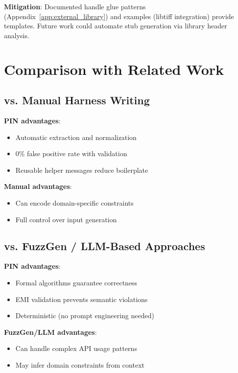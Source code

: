 \documentclass[doublespace,nopageskip]{VTthesis}
\begin{document}
\textbf{Mitigation}: Documented handle glue patterns (Appendix~\ref{app:external_library}) and examples (libtiff integration) provide templates. Future work could automate stub generation via library header analysis.

\section{Comparison with Related Work}

\subsection{vs. Manual Harness Writing}

\textbf{PIN advantages}:
\begin{itemize}
    \item Automatic extraction and normalization
    \item 0\% false positive rate with validation
    \item Reusable helper messages reduce boilerplate
\end{itemize}

\textbf{Manual advantages}:
\begin{itemize}
    \item Can encode domain-specific constraints
    \item Full control over input generation
\end{itemize}

\subsection{vs. FuzzGen / LLM-Based Approaches}

\textbf{PIN advantages}:
\begin{itemize}
    \item Formal algorithms guarantee correctness
    \item EMI validation prevents semantic violations
    \item Deterministic (no prompt engineering needed)
\end{itemize}

\textbf{FuzzGen/LLM advantages}:
\begin{itemize}
    \item Can handle complex API usage patterns
    \item May infer domain constraints from context
\end{itemize}
\end{document}
